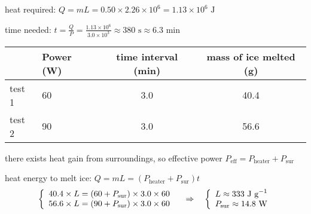 	
\begin{soln} heat required: $Q=mL = 0.50 \times 2.26 \times 10^6 = 1.13 \times 10^6 \text{ J}$
	
time needed: $t=\frac{Q}{P} = \frac{1.13 \times 10^6}{3.0\times 10^3} \approx 380 \text{ s} \approx 6.3 \text{ min}$ \end{soln}
 

\begin{center}
	\begin{tabular}{|C{1.6cm}|C{2cm}|c|c|}
		\hline  & Power (W) & time interval (min) & mass of ice melted (g) \\ 
		\hline test 1 & 60 & 3.0 & 40.4 \\ 
		\hline test 2 & 90 & 3.0 & 56.6 \\ 
		\hline 
	\end{tabular} 
\end{center}

\begin{soln} there exists heat gain from surroundings, so effective power $P_\text{eff}=P_\text{heater}+P_\text{sur}$

heat energy to melt ice: $Q = mL = (P_\text{heater}+P_\text{sur}) t$
\begin{equation*}
	\left\{ \begin{array}{l}
		40.4 \times L = (60+P_\text{sur})\times3.0\times60 \\
		56.6 \times L = (90+P_\text{sur})\times3.0\times60 
	\end{array}\right.
	\quad \Rightarrow \quad \left\{ \begin{array}{l}
	L \approx 333 \text{ J g}^{-1} \\
	P_\text{sur} \approx 14.8 \text{ W} \end{array}\right. 
\end{equation*}

\end{soln}

